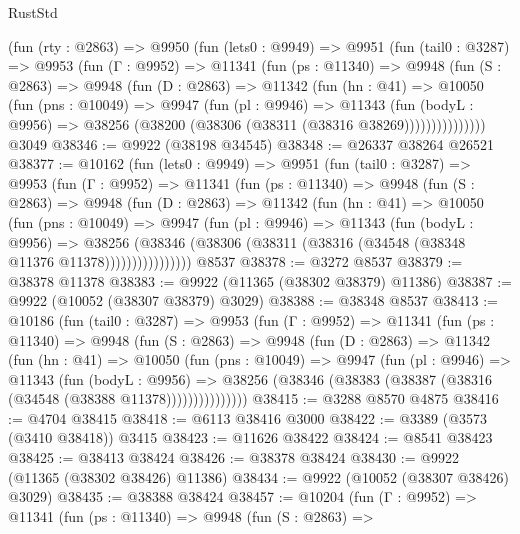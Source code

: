 \begin{lexlean}{RustStd}
\begin{coremodule}
    (fun (rty : @2863) =>
    @9950
      (fun (lets0 : @9949) =>
      @9951
        (fun (tail0 : @3287) =>
        @9953
          (fun (Γ : @9952) =>
          @11341
            (fun (ps : @11340) =>
            @9948
              (fun (S : @2863) =>
              @9948
                (fun (D : @2863) =>
                @11342
                  (fun (hn : @41) =>
                  @10050
                    (fun (pns : @10049) =>
                    @9947
                      (fun (pl : @9946) =>
                      @11343
                        (fun (bodyL : @9956) =>
                        @38256 (@38200 (@38306 (@38311 (@38316 @38269)))))))))))))))
    @3049
@38346 := @9922 (@38198 @34545)
@38348 := @26337 @38264 @26521
@38377 := @10162
    (fun (lets0 : @9949) =>
    @9951
      (fun (tail0 : @3287) =>
      @9953
        (fun (Γ : @9952) =>
        @11341
          (fun (ps : @11340) =>
          @9948
            (fun (S : @2863) =>
            @9948
              (fun (D : @2863) =>
              @11342
                (fun (hn : @41) =>
                @10050
                  (fun (pns : @10049) =>
                  @9947
                    (fun (pl : @9946) =>
                    @11343
                      (fun (bodyL : @9956) =>
                      @38256
                        (@38346
                          (@38306 (@38311 (@38316 (@34548 (@38348 @11376 @11378))))))))))))))))
    @8537
@38378 := @3272 @8537
@38379 := @38378 @11378
@38383 := @9922 (@11365 (@38302 @38379) @11386)
@38387 := @9922 (@10052 (@38307 @38379) @3029)
@38388 := @38348 @8537
@38413 := @10186
    (fun (tail0 : @3287) =>
    @9953
      (fun (Γ : @9952) =>
      @11341
        (fun (ps : @11340) =>
        @9948
          (fun (S : @2863) =>
          @9948
            (fun (D : @2863) =>
            @11342
              (fun (hn : @41) =>
              @10050
                (fun (pns : @10049) =>
                @9947
                  (fun (pl : @9946) =>
                  @11343
                    (fun (bodyL : @9956) =>
                    @38256 (@38346 (@38383 (@38387 (@38316 (@34548 (@38388 @11378)))))))))))))))
@38415 := @3288 @8570 @4875
@38416 := @4704 @38415
@38418 := @6113 @38416 @3000
@38422 := @3389 (@3573 (@3410 @38418)) @3415
@38423 := @11626 @38422
@38424 := @8541 @38423
@38425 := @38413 @38424
@38426 := @38378 @38424
@38430 := @9922 (@11365 (@38302 @38426) @11386)
@38434 := @9922 (@10052 (@38307 @38426) @3029)
@38435 := @38388 @38424
@38457 := @10204
    (fun (Γ : @9952) =>
    @11341
      (fun (ps : @11340) =>
      @9948
        (fun (S : @2863) =>

\end{coremodule}
\end{lexlean}
